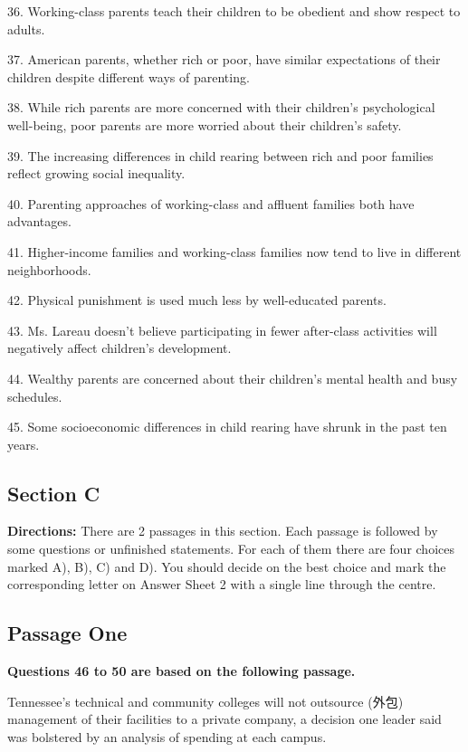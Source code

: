 \documentclass[UTF8,11pt]{ctexart}
\begin{document}
36. Working-class parents teach their children to be obedient and show respect to adults.


37. American parents, whether rich or poor, have similar expectations of their children despite different ways of parenting.


38. While rich parents are more concerned with their children's psychological well-being, poor parents are more worried about their children's safety.


39. The increasing differences in child rearing between rich and poor families reflect growing social inequality.


40. Parenting approaches of working-class and affluent families both have advantages.


41. Higher-income families and working-class families now tend to live in different neighborhoods.


42. Physical punishment is used much less by well-educated parents.


43. Ms. Lareau doesn't believe participating in fewer after-class activities will negatively affect children's development.


44. Wealthy parents are concerned about their children's mental health and busy schedules.


45. Some socioeconomic differences in child rearing have shrunk in the past ten years.


\subsection*{\textbf{Section C}}


\textbf{Directions:} There are 2 passages in this section. Each passage is followed by some questions or unfinished statements. For each of them there are four choices marked A), B), C) and D). You should decide on the best choice and mark the corresponding letter on Answer Sheet 2 with a single line through the centre.


\subsection*{\textbf{Passage One}}


\textbf{Questions 46 to 50 are based on the following passage.}


Tennessee's technical and community colleges will not outsource (外包) management of their facilities to a private company, a decision one leader said was bolstered by an analysis of spending at each campus.
\end{document}
